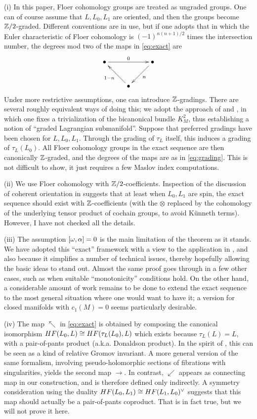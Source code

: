 \documentclass[10pt,letterpaper]{article}
\begin{document}
(i) In this paper, Floer cohomology groups are treated as ungraded groups. One
can of course assume that $L,L_0,L_1$ are oriented, and then the groups become
$\mathbb{Z}/2$-graded. Different conventions are in use, but if one adopts that in
which the Euler characteristic of Floer cohomology is $(-1)^{n(n+1)/2}$ times
the intersection number, the degrees mod two of the maps in \eqref{eq:exact}
are
\begin{equation} \label{eq:grading}
\xymatrix{
 {\bullet} \ar[rr]^{0} && {\bullet} \ar[dl]^{n} \\
 & {\bullet} \ar[ul]^{1-n}
}
\end{equation}
Under more restrictive assumptions, one can introduce $\mathbb{Z}$-gradings. There are
several roughly equivalent ways of doing this; we adopt the approach of
\cite{kontsevich94} and \cite{seidel99}, in which one fixes a trivialization of
the bicanonical bundle $K^2_M$, thus establishing a notion of ``graded
Lagrangian submanifold''. Suppose that preferred gradings have been chosen for
$L,L_0,L_1$. Through the grading of $\tau_L$ itself, this induces a grading of
$\tau_L(L_0)$. All Floer cohomology groups in the exact sequence are then
canonically $\mathbb{Z}$-graded, and the degrees of the maps are as in
\eqref{eq:grading}. This is not difficult to show, it just requires a few
Maslov index computations.

(ii) We use Floer cohomology with $\mathbb{Z}/2$-coefficients. Inspection of the
discussion of coherent orientation in \cite{fukaya-oh-ohta-ono} suggests that
at least when $L_0,L_1$ are spin, the exact sequence should exist with
$\mathbb{Z}$-coefficients (with the $\otimes$ replaced by the cohomology of the
underlying tensor product of cochain groups, to avoid K{\"u}nneth terms).
However, I have not checked all the details.

(iii) The assumption $[\omega,\alpha] = 0$ is the main limitation of the theorem as
it stands. We have adopted this ``exact'' framework with a view to the
application in \cite{seidel00}, and also because it simplifies a number of
technical issues, thereby hopefully allowing the basic ideas to stand out.
Almost the same proof goes through in a few other cases, such as when suitable
``monotonicity'' conditions hold. On the other hand, a considerable amount of
work remains to be done to extend the exact sequence to the most general
situation where one would want to have it; a version for closed manifolds with
$c_1(M) = 0$ seems particularly desirable.

(iv) The map $\nwarrow$ in \eqref{eq:exact} is obtained by composing the
canonical isomorphism $HF(L_0,L) \cong HF(\tau_L(L_0),L)$ which exists because
$\tau_L(L) = L$, with a pair-of-pants product (a.k.a. Donaldson product). In
the spirit of \cite{piunikhin-salamon-schwarz94}, this can be seen as a kind of
relative Gromov invariant. A more general version of the same formalism,
involving pseudo-holomorphic sections of fibrations with singularities, yields
the second map $\rightarrow$. In contrast, $\swarrow$ appears as connecting map
in our construction, and is therefore defined only indirectly. A symmetry
consideration using the duality $HF(L_0,L_1) \cong HF(L_1,L_0)^\vee$ suggests
that this map should actually be a pair-of-pants coproduct. That is in fact
true, but we will not prove it here.
\end{document}
